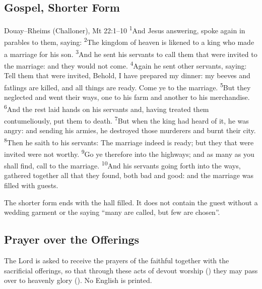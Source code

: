 \subsection{Gospel, Shorter Form}
\label{proper-gospel-short}


\begin{englishwitness}{Douay--Rheims (Challoner), Mt 22:1--10}
\textsuperscript{1}And Jesus answering, spoke again in parables to them,
saying: \textsuperscript{2}The kingdom of heaven is likened to a king who made
a marriage for his son. \textsuperscript{3}And he sent his servants to call them
that were invited to the marriage: and they would not come.
\textsuperscript{4}Again he sent other servants, saying: Tell them that were
invited, Behold, I have prepared my dinner: my beeves and fatlings are killed,
and all things are ready. Come ye to the marriage. \textsuperscript{5}But they
neglected and went their ways, one to his farm and another to his merchandise.
\textsuperscript{6}And the rest laid hands on his servants and, having treated
them contumeliously, put them to death. \textsuperscript{7}But when the king
had heard of it, he was angry: and sending his armies, he destroyed those
murderers and burnt their city. \textsuperscript{8}Then he saith to his
servants: The marriage indeed is ready; but they that were invited were not
worthy. \textsuperscript{9}Go ye therefore into the highways; and as many as
you shall find, call to the marriage. \textsuperscript{10}And his servants
going forth into the ways, gathered together all that they found, both bad and
good: and the marriage was filled with guests.
\end{englishwitness}

\noindent The shorter form ends with the hall filled. It does not contain the
guest without a wedding garment or the saying ``many are called, but few are
chosen''.

\subsection{Prayer over the Offerings}
\label{proper-prayer-over-offerings}


\noindent The Lord is asked to receive the prayers of the faithful together
with the sacrificial offerings, so that through these acts of devout worship
() they may pass over to heavenly glory
(). No English is printed.

